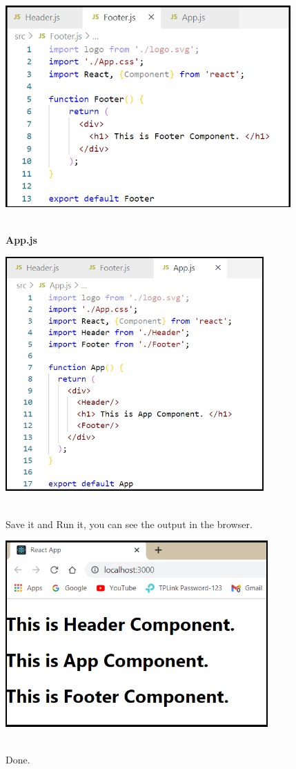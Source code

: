 \documentclass{article}
\begin{document}
\begin{center}
	\noindent \includegraphics*[width=4.31in, height=3.04in]{IMG-07-25}
\end{center}

\noindent 

\noindent 

\noindent\\
 \textbf{App.js}

\begin{center}
	\noindent \includegraphics*[width=3.90in, height=3.54in]{IMG-07-26}
\end{center}

\noindent 
\newpage
\noindent\\
 Save it and Run it, you can see the output in the browser.

\begin{center}
	\noindent \includegraphics*[width=3.96in, height=2.81in]{IMG-07-27}
\end{center}

\noindent 

\noindent\\
 Done.
\end{document}

